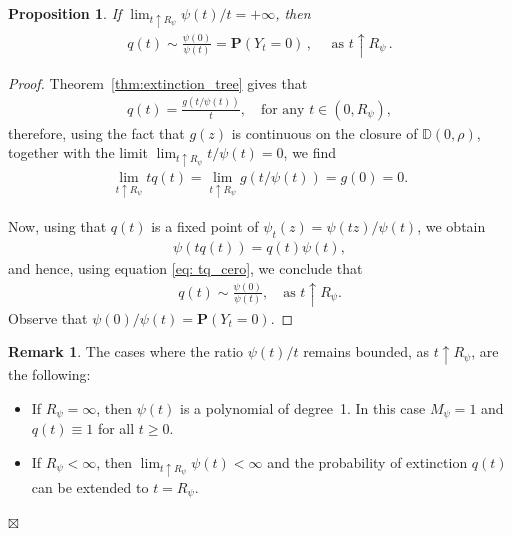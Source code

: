 \documentclass[11pt,a4paper,leqno]{amsart}
\theoremstyle{plain}
\newtheorem{propo}[theo]{Proposition}
\theoremstyle{definition}
\newtheorem{remark}[theo]{Remark}
\def\finremark{	\hfill $\boxtimes$}
\numberwithin{equation}{section}
\def\D{\mathbb{D}}
\def\P{\mathbf{P}}
\def\K{\mathcal{K}}
\begin{document}
	\begin{propo} If $\lim_{t \uparrow R_{\psi}}\psi(t)/t = +\infty$, then 
		\begin{align*}
			q(t) \sim \frac{\psi(0)}{\psi(t)} = \P(Y_t = 0)\,, \quad \text{ as } t \uparrow R_{\psi}\,.
		\end{align*}
	\end{propo}
	\begin{proof} Theorem~\ref{thm:extinction_tree} gives that
		\begin{align*}
			q(t) = \frac{g(t/\psi(t))}{t}, \quad \text{for any } t \in (0, R_{\psi}),
		\end{align*}
		therefore, using the fact that \( g(z) \) is continuous on the closure of \( \mathbb{D}(0, \rho) \), together with the limit \( \lim_{t \uparrow R_{\psi}} t/\psi(t) = 0 \), we find
		\begin{align}\label{eq: tq_cero}
			\lim_{t \uparrow R_{\psi}} t q(t) = \lim_{t \uparrow R_{\psi}} g({t}/{\psi(t)}) = g(0) = 0.
		\end{align}
		
		Now, using that \( q(t) \) is a fixed point of \( \psi_t(z) = \psi(tz)/\psi(t) \), we obtain
		\begin{align*}
			\psi(t q(t)) = q(t) \psi(t),
		\end{align*}
		and hence, using equation \eqref{eq: tq_cero}, we conclude that
		\begin{align*}
			q(t) \sim \frac{\psi(0)}{\psi(t)}, \quad \text{as } t \uparrow R_{\psi}.
		\end{align*}
			Observe that $\psi(0)/\psi(t) = \P(Y_t = 0)$.
	\end{proof}
	
	\begin{remark}
		The cases where the ratio \(\psi(t)/t\) remains bounded, as $t \uparrow R_{\psi}$, are the following:
		\begin{itemize}
			\item If \(R_{\psi} = \infty\), then \(\psi(t)\) is a polynomial of degree 1. In this case \(M_{\psi} = 1\) and \(q(t)\equiv1\) for all \(t\geq 0\).
			\smallskip
			\item If \(R_{\psi}<\infty\), then \(\lim_{t\uparrow R_{\psi}}\psi(t)<\infty\) and the probability of extinction \(q(t)\) can be extended to $t = R_{\psi}$.
	        \smallskip
%	        
%	        
%	        
		\end{itemize}\finremark
	\end{remark}
	
\end{document}
